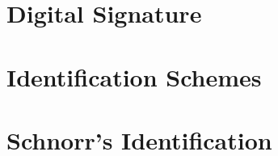 \documentclass{scribe}
\begin{document}
\maketitle


\section{Digital Signature}
\section{Identification Schemes}
\section{Schnorr's Identification}




%

\end{document}
